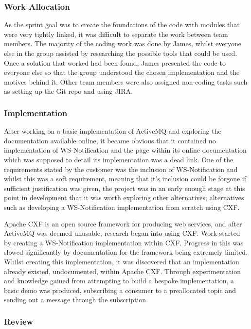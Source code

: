 \documentclass[a4paper, 12pt, twoside]{article}
\begin{document}
\subsubsection{Work Allocation}

As the sprint goal was to create the foundations of the code with modules that were very tightly linked, it was difficult to separate the work between team members. The majority of the coding work was done by James, whilst everyone else in the group assisted by researching the possible tools that could be used. Once a solution that worked had been found, James presented the code to everyone else so that the group understood the chosen implementation and the motives behind it. Other team members were also assigned non-coding tasks such as setting up the Git repo and using JIRA.

\subsubsection{Implementation}

After working on a basic implementation of ActiveMQ and exploring the documentation available online, it became obvious that it contained no implementation of WS-Notification and the page within its online documentation which was supposed to detail its implementation was a dead link. One of the requirements stated by the customer was the inclusion of WS-Notification and whilst this was a soft requirement, meaning that it's inclusion could be forgone if sufficient justification was given, the project was in an early enough stage at this point in development that it was worth exploring other alternatives; alternatives such as developing a WS-Notification implementation from scratch using CXF.

Apache CXF is an open source framework for producing web services, and after ActiveMQ was deemed unusable, research began into using CXF. Work started by creating a WS-Notification implementation within CXF. Progress in this was slowed significantly by documentation for the framework being extremely limited. Whilst creating this implementation, it was discovered that an implementation already existed, undocumented, within Apache CXF. Through experimentation and knowledge gained from attempting to build a bespoke implementation, a basic demo was produced, subscribing a consumer to a preallocated topic and sending out a message through the subscription.

\subsubsection{Review}
\end{document}
